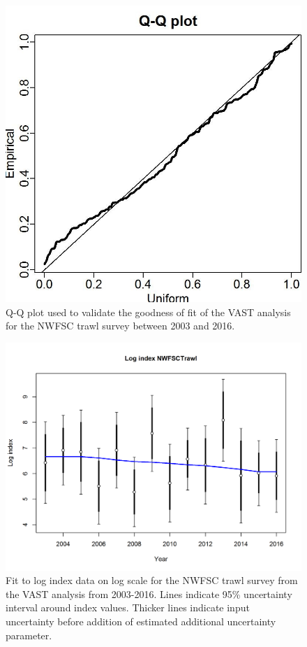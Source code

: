 \documentclass[12pt,]{article}
\begin{document}
\begin{figure}[htbp]
\centering
\includegraphics{Figures/NWFSCtrawl_QQ.jpg}
\caption{Q-Q plot used to validate the goodness of fit of the VAST
analysis for the NWFSC trawl survey between 2003 and 2016.
\label{fig:Fleet8_NWFSCtrawl_QQ}}
\end{figure}

\begin{figure}[htbp]
\centering
\includegraphics{r4ss/plots_mod1/index5_logcpuefit_NWFSCtrawl.png}
\caption{Fit to log index data on log scale for the NWFSC trawl survey
from the VAST analysis from 2003-2016. Lines indicate 95\% uncertainty
interval around index values. Thicker lines indicate input uncertainty
before addition of estimated additional uncertainty parameter.
\label{fig:index5_logcpuefit_NWFSCtrawl}}
\end{figure}
\end{document}
